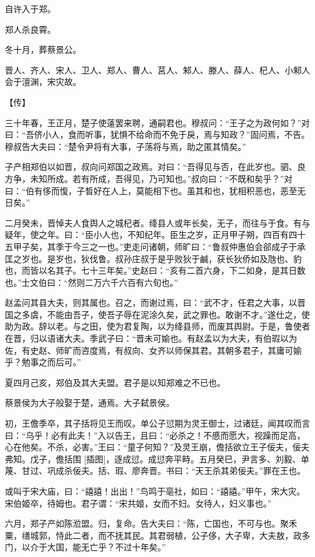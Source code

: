 \documentclass[a4paper,12pt,UTF8,twoside]{ctexbook}
\begin{document}
自许入于郑。

郑人杀良霄。

冬十月，葬蔡景公。

晋人、齐人、宋人、卫人、郑人、曹人、莒人、邾人、滕人、薛人、杞人、小邾人会于澶渊，宋灾故。

【传】

三十年春，王正月，楚子使薳罢来聘，通嗣君也。穆叔问：“王子之为政何如？”对曰：“吾侪小人，食而听事，犹惧不给命而不免于戾，焉与知政？”固问焉，不告。穆叔告大夫曰：“楚令尹将有大事，子荡将与焉，助之匿其情矣。”

子产相郑伯以如晋，叔向问郑国之政焉。对曰：“吾得见与否，在此岁也。驷、良方争，未知所成。若有所成，吾得见，乃可知也。”叔向曰：“不既和矣乎？”对曰：“伯有侈而愎，子晳好在人上，莫能相下也。虽其和也，犹相积恶也，恶至无日矣。”

二月癸未，晋悼夫人食舆人之城杞者。绛县人或年长矣，无子，而往与于食。有与疑年，使之年。曰：“臣小人也，不知纪年。臣生之岁，正月甲子朔，四百有四十五甲子矣，其季于今三之一也。”吏走问诸朝，师旷曰：“鲁叔仲惠伯会郤成子于承匡之岁也。是岁也，狄伐鲁。叔孙庄叔于是乎败狄于鹹，获长狄侨如及虺也、豹也，而皆以名其子。七十三年矣。”史赵曰：“亥有二首六身，下二如身，是其日数也。”士文伯曰：“然则二万六千六百有六旬也。”

赵孟问其县大夫，则其属也。召之，而谢过焉，曰：“武不才，任君之大事，以晋国之多虞，不能由吾子，使吾子辱在泥涂久矣，武之罪也。敢谢不才。”遂仕之，使助为政。辞以老。与之田，使为君复陶，以为绛县师，而废其舆尉。于是，鲁使者在晋，归以语诸大夫。季武子曰：“晋未可媮也。有赵孟以为大夫，有伯瑕以为佐，有史赵、师旷而咨度焉，有叔向、女齐以师保其君。其朝多君子，其庸可媮乎？勉事之而后可。”

夏四月己亥，郑伯及其大夫盟。君子是以知郑难之不已也。

蔡景侯为大子般娶于楚，通焉。大子弑景侯。

初，王儋季卒，其子括将见王而叹。单公子愆期为灵王御士，过诸廷，闻其叹而言曰：“乌乎！必有此夫！”入以告王，且曰：“必杀之！不慼而愿大，视躁而足高，心在他矣。不杀，必害。”王曰：“童子何知？”及灵王崩，儋括欲立王子佞夫，佞夫弗知。戊子，儋括围 [插图]，逐成愆。成愆奔平畤。五月癸巳，尹言多、刘毅、单蔑、甘过、巩成杀佞夫。括、瑕、廖奔晋。书曰：“天王杀其弟佞夫。”罪在王也。

或叫于宋大庙，曰：“譆譆！出出！”鸟鸣于亳社，如曰：“譆譆。”甲午，宋大灾。宋伯姬卒，待姆也。君子谓：“宋共姬，女而不妇。女待人，妇义事也。”

六月，郑子产如陈涖盟。归，复命。告大夫曰：“陈，亡国也，不可与也。聚禾粟，缮城郭，恃此二者，而不抚其民。其君弱植，公子侈，大子卑，大夫敖，政多门，以介于大国，能无亡乎？不过十年矣。”
\end{document}

